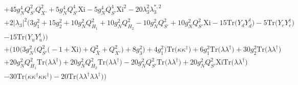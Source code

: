 {\begin{align}
 &+45 g_{N}^{4} Q_{S'}^{2} Q_{X'}^{2} +5 g_{N}^{4} Q_{S'}^{4} \text{Xi} -5 g_{N}^{4} Q_{S'}^{4} \text{Xi}^{2} -20 \lambda_{3}^{2} \lambda_{3}^{*,2} \nonumber \\ 
 &+2 |\lambda_3|^2 \Big(3 g_{1}^{2} +15 g_{2}^{2} +10 g_{N}^{2} Q_{H_1}^{2} +10 g_{N}^{2} Q_{H_2}^{2} -10 g_{N}^{2} Q_{S'}^{2} +10 g_{N}^{2} Q_{S'}^{2} \text{Xi} -15 \mbox{Tr}\Big({Y_d  Y_{d}^{\dagger}}\Big) -5 \mbox{Tr}\Big({Y_e  Y_{e}^{\dagger}}\Big) \nonumber \\ 
 &-15 \mbox{Tr}\Big({Y_u  Y_{u}^{\dagger}}\Big) \Big)\nonumber \\ 
 &+\Big(10 \Big(3 g_{N}^{2} \Big(Q_{S'}^{2} \Big(-1 + \text{Xi}\Big) + Q_{\bar{X}}^{2} + Q_{X'}^{2}\Big) + 8 g_{3}^{2} \Big) + 4 g_{1}^{2} \Big)\mbox{Tr}\Big({\kappa  \kappa^{\dagger}}\Big) +6 g_{1}^{2} \mbox{Tr}\Big({\lambda  \lambda^{\dagger}}\Big) +30 g_{2}^{2} \mbox{Tr}\Big({\lambda  \lambda^{\dagger}}\Big) \nonumber \\ 
 &+20 g_{N}^{2} Q_{H_1}^{2} \mbox{Tr}\Big({\lambda  \lambda^{\dagger}}\Big) +20 g_{N}^{2} Q_{H_2}^{2} \mbox{Tr}\Big({\lambda  \lambda^{\dagger}}\Big) -20 g_{N}^{2} Q_{S'}^{2} \mbox{Tr}\Big({\lambda  \lambda^{\dagger}}\Big) +20 g_{N}^{2} Q_{S'}^{2} \text{Xi} \mbox{Tr}\Big({\lambda  \lambda^{\dagger}}\Big) \nonumber \\ 
 &-30 \mbox{Tr}\Big({\kappa  \kappa^{\dagger}  \kappa  \kappa^{\dagger}}\Big) -20 \mbox{Tr}\Big({\lambda  \lambda^{\dagger}  \lambda  \lambda^{\dagger}}\Big) \Big)
\end{align}} 
